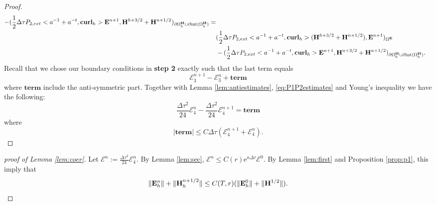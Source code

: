 \documentclass[12pt,reqno]{amsart}
\newcommand{\curl}{{\bf curl}}
\newcommand{\e}{{\bf E}}
\newcommand{\h}{{\bf H}}
\theoremstyle{definition}
\numberwithin{equation}{section}
\newcommand{\intr}[1]{\mathrm{int}(#1)}
\def\Gw{\Omega}     \def\Gx{\Xi}         \def\Gy{\Psi}
\def\Gwh{\Omega_h}
\begin{document}
\begin{proof}
\begin{align*}
		-(\frac{1}{2}\Delta \tau P_{2,ext}<a^{-1}+a^{-t},\curl_h>\e^{n+1},\h^{h+3/2}+\h^{n+1/2})_{\partial{\Gwh^\h}\cup \partial \intr{\Gwh^\h}}=\\&
		(\frac{1}{2}\Delta \tau P_{2,ext}<a^{-1}+a^{-t},\curl_h>(\h^{h+3/2}+\h^{n+1/2}),\e^{n+1})_{{{\Gw^\e}}}
		\\&
		-(\frac{1}{2}\Delta \tau P_{2,ext}<a^{-1}+a^{-t},\curl_h>\e^{n+1},\h^{n+3/2}+\h^{n+1/2})_{\partial{\Gwh^\h}\cup \partial \intr{\Gwh^\h}}.
	\end{align*}
	Recall that we chose our boundary conditions in {\bf step 2} exactly  such that 
	the last term equals $$\mathcal{E}_3^{n+1}-\mathcal{E}_3^{n}+
	\mathbf{term}$$ where $\mathbf{term}$ include the anti-symmetric part.
	Together with Lemma \ref{lem:antiestimates}, \eqref{eq:P1P2estimates} and Young's inequality we have the following:
		$$\frac{\Delta \tau^2}{24}\mathcal{E}_4^n-
\frac{\Delta \tau^2}{24}	\mathcal{E}_4^{n+1}=
	\mathbf{term}
		$$
		where 
		$$
	|	\mathbf{term}|\leq C \Delta \tau( \mathcal{E}_4^{n+1}+\mathcal{E}_4^{n}).
		$$
\end{proof}
\begin{proof}[proof of Lemma \ref{lem:coer}]
Let $\mathcal{E}^n:=\frac{\Delta \tau^2}{24}\mathcal{E}_4^n$.
By Lemma \ref{lem:sec}, $\mathcal{E}^n\leq C(r)\mathrm{e}^{n\Delta \tau}\mathcal{E}^0$.
By Lemma \ref{lem:first} and Proposition \ref{prop:p1}, this imply that 
$$
\|\e_h^n\|+\|\h_h^{n+1/2}\|\leq C(T,r)(\|\e_h^0\|+\|\h^{1/2}\|).
$$
\end{proof}
\end{document}
